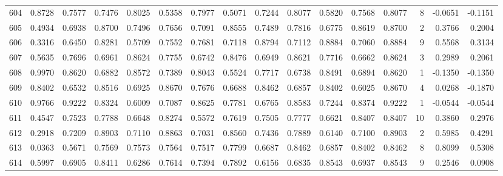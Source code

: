 \begin{tabular}{lrrrrrrrrrrrrrrr}
604 &      0.8728 &  0.7577 &  0.7476 &  0.8025 &  0.5358 &  0.7977 &  0.5071 &  0.7244 &  0.8077 &  0.5820 &   0.7568 &     0.8077 &      8 &                   -0.0651 &                    -0.1151 \\
605 &      0.4934 &  0.6938 &  0.8700 &  0.7496 &  0.7656 &  0.7091 &  0.8555 &  0.7489 &  0.7816 &  0.6775 &   0.8619 &     0.8700 &      2 &                    0.3766 &                     0.2004 \\
606 &      0.3316 &  0.6450 &  0.8281 &  0.5709 &  0.7552 &  0.7681 &  0.7118 &  0.8794 &  0.7112 &  0.8884 &   0.7060 &     0.8884 &      9 &                    0.5568 &                     0.3134 \\
607 &      0.5635 &  0.7696 &  0.6961 &  0.8624 &  0.7755 &  0.6742 &  0.8476 &  0.6949 &  0.8621 &  0.7716 &   0.6662 &     0.8624 &      3 &                    0.2989 &                     0.2061 \\
608 &      0.9970 &  0.8620 &  0.6882 &  0.8572 &  0.7389 &  0.8043 &  0.5524 &  0.7717 &  0.6738 &  0.8491 &   0.6894 &     0.8620 &      1 &                   -0.1350 &                    -0.1350 \\
609 &      0.8402 &  0.6532 &  0.8516 &  0.6925 &  0.8670 &  0.7676 &  0.6688 &  0.8462 &  0.6857 &  0.8402 &   0.6025 &     0.8670 &      4 &                    0.0268 &                    -0.1870 \\
610 &      0.9766 &  0.9222 &  0.8324 &  0.6009 &  0.7087 &  0.8625 &  0.7781 &  0.6765 &  0.8583 &  0.7244 &   0.8374 &     0.9222 &      1 &                   -0.0544 &                    -0.0544 \\
611 &      0.4547 &  0.7523 &  0.7788 &  0.6648 &  0.8274 &  0.5572 &  0.7619 &  0.7505 &  0.7777 &  0.6621 &   0.8407 &     0.8407 &     10 &                    0.3860 &                     0.2976 \\
612 &      0.2918 &  0.7209 &  0.8903 &  0.7110 &  0.8863 &  0.7031 &  0.8560 &  0.7436 &  0.7889 &  0.6140 &   0.7100 &     0.8903 &      2 &                    0.5985 &                     0.4291 \\
613 &      0.0363 &  0.5671 &  0.7569 &  0.7573 &  0.7564 &  0.7517 &  0.7799 &  0.6687 &  0.8462 &  0.6857 &   0.8402 &     0.8462 &      8 &                    0.8099 &                     0.5308 \\
614 &      0.5997 &  0.6905 &  0.8411 &  0.6286 &  0.7614 &  0.7394 &  0.7892 &  0.6156 &  0.6835 &  0.8543 &   0.6937 &     0.8543 &      9 &                    0.2546 &                     0.0908 \\

\end{tabular}
